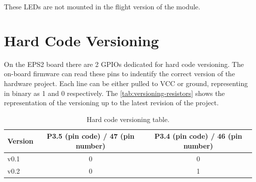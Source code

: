 These LEDs are not mounted in the flight version of the module.

\section{Hard Code Versioning}

On the EPS2 board there are 2 GPIOs dedicated for hard code versioning.
The on-board firmware can read these pins to indentify the correct version of the hardware project.
Each line can be either pulled to VCC or ground, representing in binary as 1 and 0 respectively.
The \autoref{tab:versioning-resistors} shows the representation of the versioning up to the latest revision of the project.

\begin{table}[!h]
    \centering
    \begin{tabular}{lcc}
        \toprule[1.5pt]
        \textbf{Version}    &   \textbf{P3.5 (pin code) / 47 (pin number)}    &    \textbf{P3.4 (pin code) / 46 (pin number)}\\
        \midrule
        v0.1                & 0                 & 0              \\
        v0.2                & 0                 & 1              \\
        \bottomrule[1.5pt]
    \end{tabular}
    \caption{Hard code versioning table.}
    \label{tab:versioning-resistors}
\end{table}